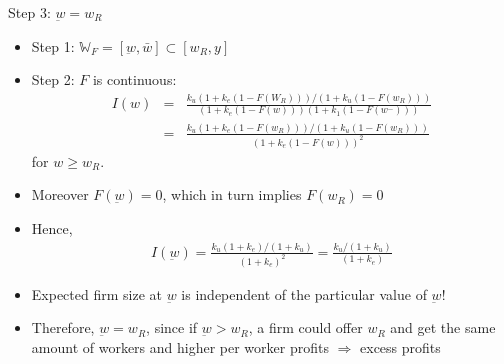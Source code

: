 \documentclass[9pt]{beamer}
\newcommand{\bit}{\begin{itemize}}
\newcommand{\eit}{\end{itemize}}
\begin{document}
\begin{frame}{Step 3: $\underbar w = w_R$}

\bit
\setlength\itemsep{1em}

\item Step 1: $\mathbb{W}_F =[\underbar w, \bar w] \subset [w_R, y]$ 

\item Step 2: $F$ is continuous:
\begin{eqnarray}
I(w) &=&  \frac{k_u (1+k_e(1-F(W_R)))/(1+k_u(1-F(w_R)))}{(1+k_e(1-F(w)))(1+k_1(1-F(w^{-})))} \nonumber \\
&=&  \frac{k_u (1+k_e(1-F(w_R)))/(1+k_u(1-F(w_R)))}{(1+k_e(1-F(w)))^2} \nonumber
\end{eqnarray}
for $w \geq w_R$. 

\item Moreover $F(\underbar w) = 0$, which in turn implies $F(w_R)=0$

\item Hence, 
\begin{eqnarray}
I(\underbar w) =  \frac{k_u (1+k_e)/(1+k_u)}{(1+k_e)^2} =  \frac{k_u /(1+k_u)}{(1+k_e)} \nonumber
\end{eqnarray}

\item Expected firm size at $\underbar w$ is independent of the particular value of $\underbar w$!

\item Therefore, $\underbar w = w_R$, since if $\underbar w > w_R$, a firm could offer $w_R$ and get the same amount of workers and higher per worker profits $\Rightarrow$ excess profits
%

\eit

\end{frame}
\end{document}
